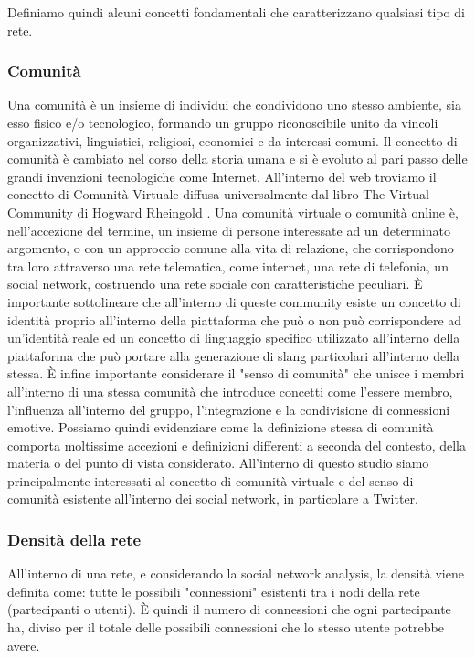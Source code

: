 Definiamo quindi alcuni concetti fondamentali che caratterizzano qualsiasi tipo di rete.

\subsubsection{Comunità}

Una comunità è un insieme di individui che condividono uno stesso ambiente, sia esso fisico e/o tecnologico, formando un gruppo riconoscibile unito da vincoli organizzativi, linguistici, religiosi, economici e da interessi comuni. \cite{Comunita}
Il concetto di comunità è cambiato nel corso della storia umana e si è evoluto al pari passo delle grandi invenzioni tecnologiche come Internet.
All'interno del web troviamo il concetto di Comunità Virtuale \cite{ComunitaVirtuale} diffusa universalmente dal libro The Virtual Community di Hogward Rheingold \cite{VirtualCommunity}. Una comunità virtuale o comunità online è, nell'accezione del termine, un insieme di persone interessate ad un determinato argomento, o con un approccio comune alla vita di relazione, che corrispondono tra loro attraverso una rete telematica, come internet, una rete di telefonia, un social network, costruendo una rete sociale con caratteristiche peculiari. È importante sottolineare che all'interno di queste community esiste un concetto di identità proprio all'interno della piattaforma che può o non può corrispondere ad un'identità reale ed un concetto di linguaggio specifico utilizzato all'interno della piattaforma che può portare alla generazione di slang particolari all'interno della stessa.
È infine importante considerare il "senso di comunità" \cite{ComunitaSenso} che unisce i membri all'interno di una stessa comunità che introduce concetti come l'essere membro, l'influenza all'interno del gruppo, l'integrazione e la condivisione di connessioni emotive.
Possiamo quindi evidenziare come la definizione stessa di comunità comporta moltissime accezioni e definizioni differenti a seconda del contesto, della materia o del punto di vista considerato.
All'interno di questo studio siamo principalmente interessati al concetto di comunità virtuale e del senso di comunità esistente all'interno dei social network, in particolare a Twitter.

\subsubsection{Densità della rete}
All'interno di una rete, e considerando la social network analysis, la densità viene definita come: tutte le possibili "connessioni" esistenti tra i nodi della rete (partecipanti o utenti). È quindi il numero di connessioni che ogni partecipante ha, diviso per il totale delle possibili connessioni che lo stesso utente potrebbe avere. \cite{PatternNetworkLearning}

